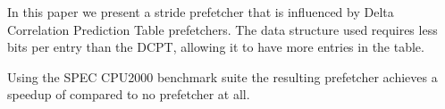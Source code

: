 In this paper we present a stride prefetcher that is influenced by Delta Correlation
Prediction Table prefetchers. The data structure used requires less bits per entry than the
DCPT, allowing it to have more entries in the table. 

Using the SPEC CPU2000 benchmark suite the resulting prefetcher achieves a 
speedup of \speedup compared to no prefetcher at all.
